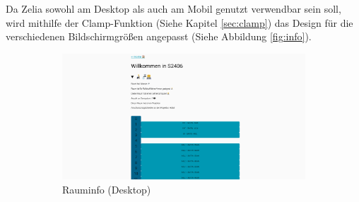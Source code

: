 
\clearpage
{}

Da Zelia sowohl am Desktop als auch am Mobil genutzt verwendbar sein soll, wird mithilfe der Clamp-Funktion (Siehe Kapitel \ref{sec:clamp}) das Design für die verschiedenen Bildschirmgrößen angepasst (Siehe Abbildung \ref{fig:info}).


\begin{figure}[H]
    \begin{subfigure}[c]{0.65\textwidth}
        \centering
        \includegraphics[width=\textwidth]{media/ResponsiveDesign/ZeliaDesktop.png}
        \caption{Rauminfo (Desktop)}
    \end{subfigure} \hfill
    \begin{subfigure}[c]{0.35\textwidth}
        \centering

\end{subfigure}
\end{figure}
